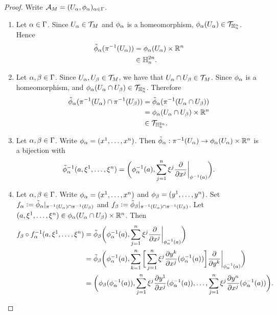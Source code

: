 \documentclass{book}
\begin{document}
\begin{proof}
	Write $\mathcal{A}_M = (U_{\alpha}, \phi_{\alpha})_{\alpha \in \Gamma}$. 
	\begin{enumerate}[label=(\alph*)]
		\item Let $\alpha \in \Gamma$. Since $U_{\alpha} \in \mathcal{T}_M$ and $\phi_{\alpha}$ is a homeomorphism, $\phi_{\alpha}(U_{\alpha}) \in \mathcal{T}_{\mathbb{H}_n^n}$. Hence 
		\begin{align*}
			\tilde{\phi}_{\alpha}(\pi^{-1}(U_{\alpha}))
			& = \phi_{\alpha}(U_{\alpha}) \times \mathbb{R}^n \\
			& \in \mathbb{H}_n^{2n}.
		\end{align*}
		\item Let $\alpha, \beta \in \Gamma$. Since $U_{\alpha}, U_{\beta} \in \mathcal{T}_M$, we have that $U_{\alpha} \cap U_{\beta} \in \mathcal{T}_M$. Since $\phi_{\alpha}$ is a homeomorphism, and $\phi_{\alpha}(U_{\alpha} \cap U_{\beta}) \in \mathcal{T}_{\mathbb{H}_n^n}$. Therefore 
		\begin{align*}
			\tilde{\phi}_{\alpha}(\pi^{-1}(U_{\alpha}) \cap \pi^{-1}(U_{\beta}))
			& = \tilde{\phi}_{\alpha}(\pi^{-1}(U_{\alpha} \cap U_{\beta})) \\
			& = \phi_{\alpha}(U_{\alpha} \cap U_{\beta}) \times \mathbb{R}^n \\
			& \in \mathcal{T}_{\mathbb{H}_n^{2n}}.
		\end{align*} 
		\item Let $\alpha, \beta \in \Gamma$. Write $\phi_{\alpha} = (x^1, \ldots, x^n)$. Then $\tilde{\phi}_{\alpha}: \pi^{-1}(U_{\alpha}) \rightarrow \phi_{\alpha}(U_{\alpha}) \times \mathbb{R}^n$ is a bijection with 
		$$\tilde{\phi}_{\alpha}^{-1}(a, \xi^1, \ldots, \xi^n) = \bigg (\phi_{\alpha}^{-1}(a), \sum\limits_{j=1}^n \xi^j \frac{\partial}{\partial x^j} \bigg |_{\phi^{-1}(a)} \bigg).$$ 
		\item Let $\alpha, \beta \in \Gamma$. Write $\phi_{\alpha} = (x^1, \ldots, x^n)$ and $\phi_{\beta} = (y^1, \ldots, y^n)$. Set $f_{\alpha} \vcentcolon= \tilde{\phi}_{\alpha}|_{\pi^{-1}(U_{\alpha}) \cap \pi^{-1}(U_{\beta})}$ and $f_{\beta} \vcentcolon= \tilde{\phi}_{\beta}|_{\pi^{-1}(U_{\alpha}) \cap \pi^{-1}(U_{\beta})}$. Let $(a, \xi^1, \ldots, \xi^n) \in \phi_{\alpha}(U_{\alpha} \cap U_{\beta}) \times \mathbb{R}^n$. Then
		\begin{align*}
			 f_{\be} \circ f_{\al}^{-1}(a, \xi^1, \ldots, \xi^n) 
			& = \tl{\phi}_{\be} \bigg (\phi_{\al}^{-1}(a), \sum\limits_{j=1}^n \xi^j \frac{\p}{\p x^j} \bigg |_{\phi_{\al}^{-1}(a)} \bigg) \\
			& = \tl{\phi}_{\be} \bigg (\phi_{\al}^{-1}(a), \sum_{k=1}^n \bigg[  \sum\limits_{j=1}^n \xi^j \frac{\p y^k}{\p x^j}(\phi_{\al}^{-1}(a)) \bigg] \frac{\p}{\p y^k} \bigg |_{\phi_{\al}^{-1}(a)} \bigg) \\
			& = \bigg (\phi_{\be} (\phi_{\al}^{-1}(a)),   \sum\limits_{j=1}^n \xi^j \frac{\p y^1}{\p x^j}(\phi_{\al}^{-1}(a)), \ldots,  \sum\limits_{j=1}^n \xi^j \frac{\p y^n}{\p x^j}(\phi_{\al}^{-1}(a)) \bigg).

\end{align*}
\end{enumerate}
\end{proof}
\end{document}
